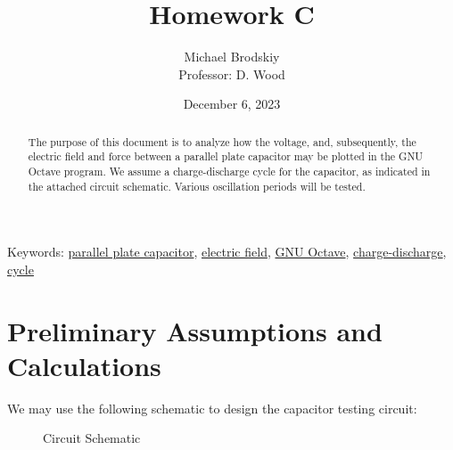 


\title{Homework C}
\date{December 6, 2023}
\author{Michael Brodskiy\\ \small Professor: D. Wood}



\maketitle

\newpage

\begin{abstract}

  The purpose of this document is to analyze how the voltage, and, subsequently, the electric field  and force between a parallel plate capacitor may be plotted in the GNU Octave program. We assume a charge-discharge cycle for the capacitor, as indicated in the attached circuit schematic. Various oscillation periods will be tested.

\end{abstract}

\begin{flushleft}
  Keywords: \underline{parallel plate capacitor}, \underline{electric field}, \underline{GNU Octave}, \underline{charge-discharge}, \underline{cycle}
\end{flushleft}

\newpage

\tableofcontents

\newpage

\section{Preliminary Assumptions and Calculations}

We may use the following schematic to design the capacitor testing circuit:

\begin{figure}[H]
  \centering
  
  \caption{Circuit Schematic}
  \label{fig:1}
\end{figure}

